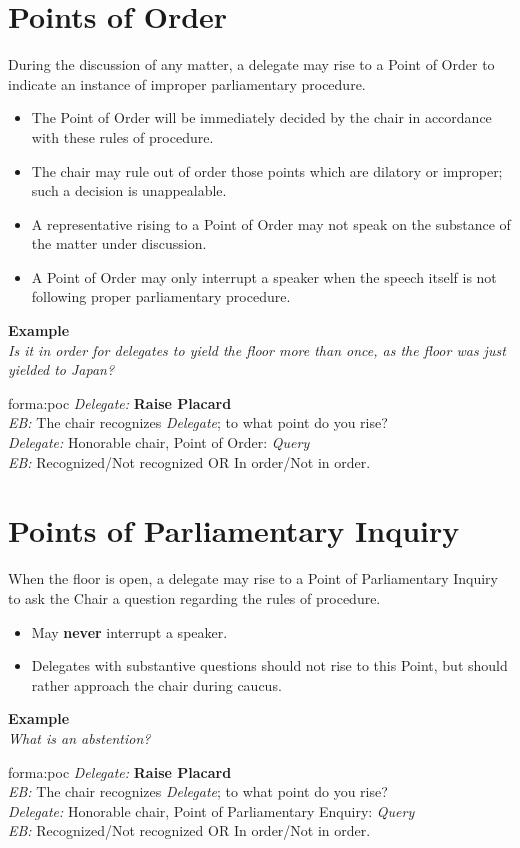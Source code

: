 \section{Points of Order}
During the discussion of any matter, a delegate may rise to a Point of Order to indicate an instance of improper parliamentary procedure. 
\begin{itemize}
	\item The Point of Order will be immediately decided by the \Gls{chair} in accordance with these rules of procedure.
	\item The \Gls{chair} may rule out of order those points which are dilatory or improper; such a decision is unappealable.
	\item A representative rising to a Point of Order may not speak on the substance of the matter under discussion.
	\item A Point of Order may only interrupt a speaker when the speech itself is not following proper parliamentary procedure.
\end{itemize}
\textbf{Example}\\
\textit{Is it in order for delegates to \gls{yield} the floor more than once, as the floor was just yielded to Japan?}
\begin{note}[Format]{forma:poc}
\emph{Delegate:} \textbf{Raise Placard} \\
\emph{EB:} The \Gls{chair} recognizes \emph{Delegate}; to what point do you rise? \\
\emph{Delegate:} Honorable \Gls{chair}, Point of Order: \emph{Query} \\
\emph{EB:} Recognized/Not recognized OR In order/Not in order. \\
\end{note}

\section{Points of Parliamentary Inquiry}
When the floor is open, a delegate may rise to a Point of Parliamentary Inquiry to ask the Chair a question regarding the rules of procedure.
\begin{itemize}
	\item May \textbf{never} interrupt a speaker.
	\item Delegates with substantive questions should not rise to this Point, but should rather approach the \Gls{chair} during \gls{caucus}.
\end{itemize}
\textbf{Example}\\
\textit{What is an abstention?}
\begin{note}[Format]{forma:poc}
\emph{Delegate:} \textbf{Raise Placard} \\
\emph{EB:} The \Gls{chair} recognizes \emph{Delegate}; to what point do you rise? \\
\emph{Delegate:} Honorable \Gls{chair}, Point of Parliamentary Enquiry: \emph{Query} \\
\emph{EB:} Recognized/Not recognized OR In order/Not in order. \\
\end{note}